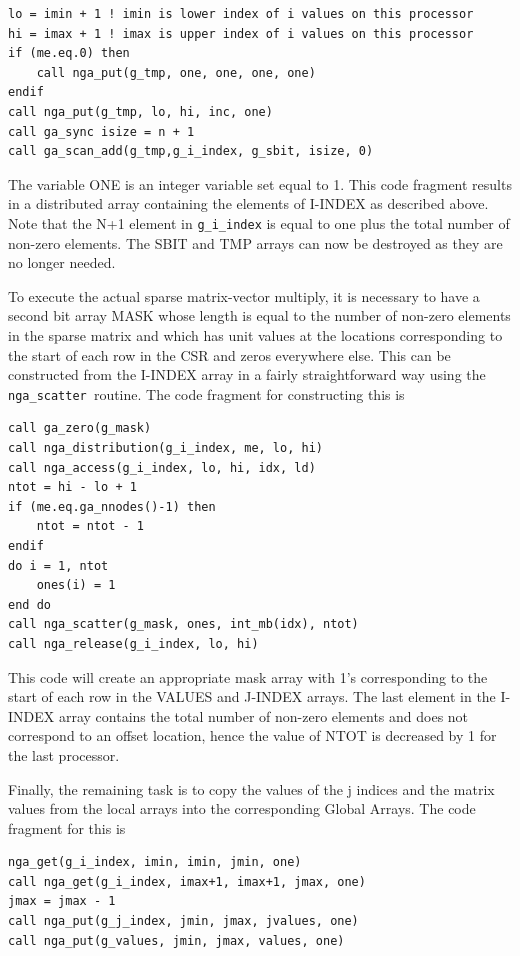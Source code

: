 \begin{lstlisting}[style=cppnoframe]
lo = imin + 1 ! imin is lower index of i values on this processor
hi = imax + 1 ! imax is upper index of i values on this processor
if (me.eq.0) then
    call nga_put(g_tmp, one, one, one, one)
endif
call nga_put(g_tmp, lo, hi, inc, one)
call ga_sync isize = n + 1
call ga_scan_add(g_tmp,g_i_index, g_sbit, isize, 0)
\end{lstlisting}

The variable ONE is an integer variable set equal to 1. This code
fragment results in a distributed array containing the elements of
I-INDEX as described above. Note that the N+1 element in \texttt{g\_i\_index}
is equal to one plus the total number of non-zero elements. The SBIT
and TMP arrays can now be destroyed as they are no longer needed.

To execute the actual sparse matrix-vector multiply, it is necessary
to have a second bit array MASK whose length is equal to the number
of non-zero elements in the sparse matrix and which has unit values
at the locations corresponding to the start of each row in the CSR
and zeros everywhere else. This can be constructed from the I-INDEX
array in a fairly straightforward way using the \texttt{nga\_scatter
}routine. The code fragment for constructing this is
\begin{lstlisting}[style=cppnoframe]
call ga_zero(g_mask)
call nga_distribution(g_i_index, me, lo, hi)
call nga_access(g_i_index, lo, hi, idx, ld)
ntot = hi - lo + 1 
if (me.eq.ga_nnodes()-1) then
    ntot = ntot - 1
endif
do i = 1, ntot
    ones(i) = 1
end do
call nga_scatter(g_mask, ones, int_mb(idx), ntot)
call nga_release(g_i_index, lo, hi)
\end{lstlisting}

This code will create an appropriate mask array with 1\textquoteright{}s
corresponding to the start of each row in the VALUES and J-INDEX arrays.
The last element in the I-INDEX array contains the total number of
non-zero elements and does not correspond to an offset location, hence
the value of NTOT is decreased by 1 for the last processor.

Finally, the remaining task is to copy the values of the j indices
and the matrix values from the local arrays into the corresponding
Global Arrays. The code fragment for this is
\begin{lstlisting}[style=cppnoframe]
nga_get(g_i_index, imin, imin, jmin, one)
call nga_get(g_i_index, imax+1, imax+1, jmax, one)
jmax = jmax - 1
call nga_put(g_j_index, jmin, jmax, jvalues, one)
call nga_put(g_values, jmin, jmax, values, one)
\end{lstlisting}

